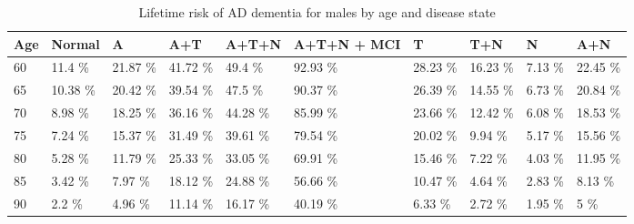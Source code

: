 \begin{table}[ht]
\centering
\begin{tabular}{llllllllll}
  \hline
Age & Normal & A & A+T & A+T+N & A+T+N + MCI & T & T+N & N & A+N \\ 
  \hline
60 & 11.4 \% & 21.87 \% & 41.72 \% & 49.4 \% & 92.93 \% & 28.23 \% & 16.23 \% & 7.13 \% & 22.45 \% \\ 
  65 & 10.38 \% & 20.42 \% & 39.54 \% & 47.5 \% & 90.37 \% & 26.39 \% & 14.55 \% & 6.73 \% & 20.84 \% \\ 
  70 & 8.98 \% & 18.25 \% & 36.16 \% & 44.28 \% & 85.99 \% & 23.66 \% & 12.42 \% & 6.08 \% & 18.53 \% \\ 
  75 & 7.24 \% & 15.37 \% & 31.49 \% & 39.61 \% & 79.54 \% & 20.02 \% & 9.94 \% & 5.17 \% & 15.56 \% \\ 
  80 & 5.28 \% & 11.79 \% & 25.33 \% & 33.05 \% & 69.91 \% & 15.46 \% & 7.22 \% & 4.03 \% & 11.95 \% \\ 
  85 & 3.42 \% & 7.97 \% & 18.12 \% & 24.88 \% & 56.66 \% & 10.47 \% & 4.64 \% & 2.83 \% & 8.13 \% \\ 
  90 & 2.2 \% & 4.96 \% & 11.14 \% & 16.17 \% & 40.19 \% & 6.33 \% & 2.72 \% & 1.95 \% & 5 \% \\ 
   \hline
\end{tabular}
\caption{Lifetime risk of AD dementia for males by age and disease state} 
\end{table}

